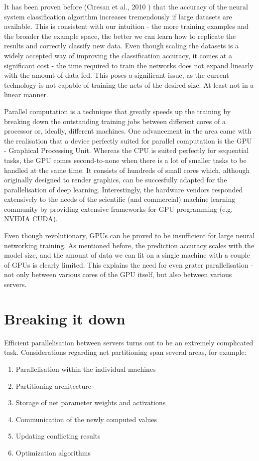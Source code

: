 \documentclass[a4paper, 11pt]{article}
\numberwithin{equation}{section}
\begin{document}
		It has been proven before (Ciresan et al., 2010 \cite{ciresan2010deep}) that the accuracy of the neural system classification algorithm increases tremendously if large datasets are available. This is consistent with our intuition - the more training examples and the broader the example space, the better we can learn how to replicate the results and correctly classify new data. Even though scaling the datasets is a widely accepted way of improving the classification accuracy, it comes at a significant cost - the time required to train the networks does not expand linearly with the amount of data fed. This poses a significant issue, as the current technology is not capable of training the nets of the desired size. At least not in a linear manner.
		
		Parallel computation is a technique that greatly speeds up the training by breaking down the outstanding training jobs between different cores of a processor or, ideally, different machines. One advancement in the area came with the realisation that a device perfectly suited for parallel computation is the GPU - Graphical Processing Unit. Whereas the CPU is suited perfectly for sequential tasks, the GPU comes second-to-none when there is a lot of smaller tasks to be handled at the same time. It consists of hundreds of small cores which, although originally designed to render graphics, can be succesfully adapted for the parallelisation of deep learning. Interestingly, the hardware vendors responded extensively to the needs of the scientific (and commercial) machine learning community by providing extensive frameworks for GPU programming (e.g. NVIDIA CUDA).
		
		Even though revolutionary, GPUs can be proved to be insufficient for large neural networking training. As mentioned before, the prediction accuracy scales with the model size, and the amount of data we can fit on a single machine with a couple of GPUs is clearly limited. This explains the need for even grater parallelisation - not only between various cores of the GPU itself, but also between various servers. 
		
		\section{Breaking it down}
		\label{breakingitdown}
		
		Efficient parallelisation between servers turns out to be an extremely complicated task. Considerations regarding net partitioning span several areas, for example:
		\begin{enumerate}
		\item Parallelisation within the individual machines
		\item Partitioning architecture
		\item Storage of net parameter weights and activations
		\item Communication of the newly computed values
		\item Updating conflicting results
		\item Optimization algorithms
		\end{enumerate}
		
\end{document}

